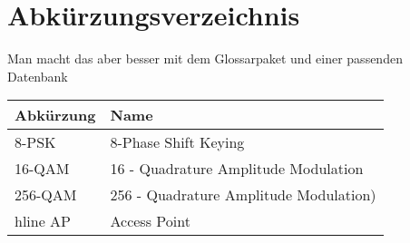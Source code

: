 \chapter{Abkürzungsverzeichnis}

Man macht das aber besser mit dem Glossarpaket und einer passenden Datenbank

\begin{tabular}{|m{5cm}|m{8cm}|}\firsthline
Abkürzung&Name\\\hline

8-PSK&8-Phase Shift Keying\\\hline
16-QAM&16 - Quadrature Amplitude Modulation\\\hline
256-QAM&256 - Quadrature Amplitude Modulation)\\hline
AP&Access Point\\\hline
\end{tabular}

